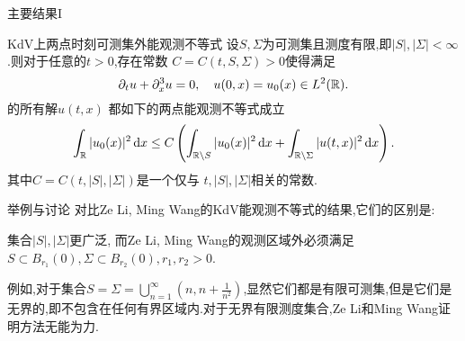 \begin{frame}[t]{主要结果I}
  \begin{alertblock}{KdV上两点时刻可测集外能观测不等式}
    设$S,\Sigma$为可测集且测度有限,即$|S|,|\Sigma|<\infty$.则对于任意的$t>0$,存在常数 $C=C(t,S,\Sigma)>0$使得满足
    \[ 
    \partial_t u +\partial_x^3u=0,\quad u(0,x)=u_0(x)\in L^2(\mathbb{R}).
    \] 
    的所有解$u(t,x)$ 都如下的两点能观测不等式成立
  \begin{equation}\label{obkdv}
    \int_{\mathbb{R}}|u_0(x)|^2\,\mathrm{d}x\le C \left( \int_{\mathbb{R}\setminus S}|u_0(x)|^2\,\mathrm{d}x + \int_{\mathbb{R}\setminus \Sigma} |u(t,x)|^2\,\mathrm{d}x  \right). 
  \end{equation}
  其中$C=C(t,|S|,|\Sigma|)$是一个仅与 $t,|S|,|\Sigma|$相关的常数.
  \end{alertblock}
\end{frame}
\begin{frame}[t]{举例与讨论}
  对比Ze Li, Ming Wang的KdV能观测不等式的结果,它们的区别是:
  \begin{alertblock}{}
    集合$|S|,|\Sigma|$更广泛, 而Ze Li, Ming Wang的观测区域外必须满足$S\subset B_{r_1}(0),\Sigma\subset B_{r_2}(0),r_1,r_2>0$.
  \end{alertblock}
  例如,对于集合$S=\Sigma=\bigcup_{n=1}^\infty \left(n,n+\frac{1}{n^2}\right)$,显然它们都是有限可测集,但是它们是无界的,即不包含在任何有界区域内.对于无界有限测度集合,Ze Li和Ming Wang证明方法无能为力.
\end{frame}


